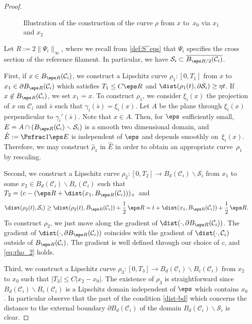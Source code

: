 \begin{proof}
\begin{figure}
\begin{tikzpicture}[scale=.9]
\end{tikzpicture}

\caption{\label{fig:John}Illustration of the construction of the curve $\rho$ from $x$ to~$x_0$ via $x_1$ and $x_2$}
\end{figure}

Let $R := 2 \|\Psi_i\|_\infty$, where we recall from \eqref{def:S^eps} that $\Psi_i$ specifies the cross section of the reference filament. In particular, we have $\mathcal S_i \subset \overline{B_{\eps R/2}(\mathcal C_i)}$.

First, if $x \in B_{\eps R}(\mathcal C_i)$, we construct a Lipschitz curve $\rho_1 \colon [0, T_1]$ from $x$ to $x_1 \in \partial B_{\eps R}(\mathcal C_i)$ which satisfies $T_1 \leq C \eps R$ and $\dist(\rho_1(t),\partial \mathcal S_i) \geq \eta t$.
If $x \not \in B_{\eps R}(\mathcal C_i)$, we set $x_1 = x$. To construct $\rho_1$, we consider $\xi_i(x)$ the projection of $x$ on $\mathcal C_i$ and $\bar s$ such that $\gamma_i (\bar s) = \xi_i (x)$. Let $A$ be the plane through $\xi_i(x)$ perpendicular to $\gamma_i'(\bar s)$. Note that $x \in A$.
Then, for $\eps$ sufficiently small, $E = A \cap (B_{\eps R}(\mathcal C_i) \smallsetminus \mathcal S_i)$ is a smooth two dimensional domain, and $\hat E := \Psfrac 1 \eps E$ is independent of $\eps$ and depends smoothly on~$\xi_i(x)$. Therefore, we may construct $\hat \rho_1$ in $\hat E$ in order to obtain an appropriate curve~$\rho_1$ by rescaling.

Second, we construct a Lipschitz curve $\rho_2 \colon [0,T_2] \to B_d(\mathcal
C_i) \smallsetminus \mathcal S_i$ from $x_1$ to some $x_2 \in B_d(\mathcal C_i) \smallsetminus B_c(\mathcal C_i)$
such that $T_2 = (c - (\eps R + \dist(x_1, B_{\eps R}(\mathcal C_i)))_+$ and
\begin{equation} \label{eq:rho_2}
\dist(\rho_2(t), \mathcal S_i) \geq \dist(\rho_2(t), B_{\eps R}(\mathcal C_i)) + \frac 1 2\, \eps R = t + \dist(x_1, B_{\eps R}(\mathcal C_i)) + \frac 1 2\, \eps R.
\end{equation}
To construct $\rho_2$, we just move along the gradient of $\dist(\cdot,\partial B_{\eps R}(\mathcal C_i))$. The gradient
of $\dist(\cdot,\partial B_{\eps R}(\mathcal C_i))$ coincides with the gradient of $\dist(\cdot,\mathcal C_i)$ outside of $B_{\eps R}(\mathcal C_i)$. The gradient is well defined through our choice of $c$, and \eqref{eq:rho_2} holds.

Third, we construct a Lipschitz curve $\rho_3 \colon [0,T_3] \to B_d(\mathcal C_i) \smallsetminus B_c(\mathcal C_i)$ from $x_2$ to $x_0$
such that $|T_3|\leq C|x_2 - x_0|$.
The existence of $\rho_3$ is straightforward since $B_d(\mathcal C_i) \smallsetminus B_c(\mathcal C_i)$ is a Lipschitz domain independent of $\eps$ which contains $x_0$.
In particular observe that the part of the condition \eqref{dist-bd} which concerns the distance to the external boundary $\partial B_d(\mathcal C_i) $ of the domain
$B_d(\mathcal C_i) \smallsetminus \mathcal S_i$ is clear.


\end{proof}
